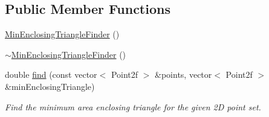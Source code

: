 \subsection*{\-Public \-Member \-Functions}
\begin{DoxyCompactItemize}
\item 
\hyperlink{classmultiscale_1_1MinEnclosingTriangleFinder_a9bac0668e32bcab3f35ddc81fea40940}{\-Min\-Enclosing\-Triangle\-Finder} ()
\item 
\hyperlink{classmultiscale_1_1MinEnclosingTriangleFinder_a356eccb6cce71d00144007df0bee1e5e}{$\sim$\-Min\-Enclosing\-Triangle\-Finder} ()
\item 
double \hyperlink{classmultiscale_1_1MinEnclosingTriangleFinder_afe74965c39261feb7152f5556c0281cd}{find} (const vector$<$ \-Point2f $>$ \&points, vector$<$ \-Point2f $>$ \&min\-Enclosing\-Triangle)
\begin{DoxyCompactList}\small\item\em \-Find the minimum area enclosing triangle for the given 2\-D point set. \end{DoxyCompactList}\end{DoxyCompactItemize}
